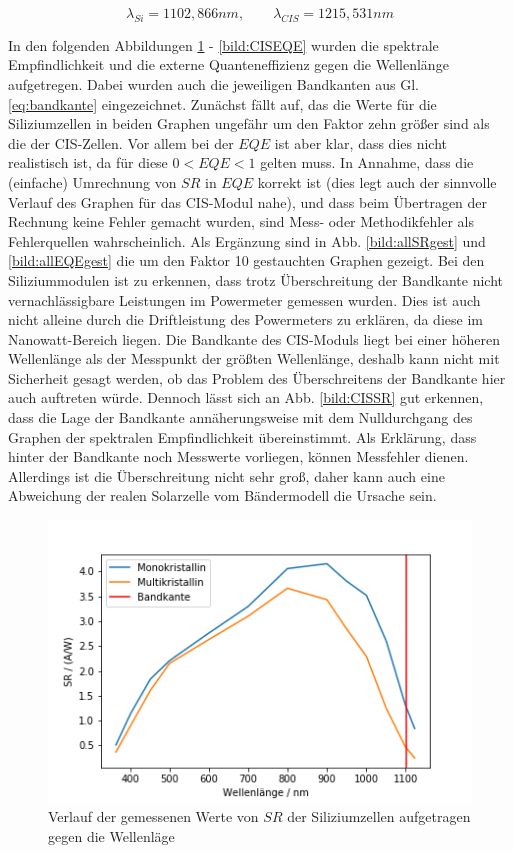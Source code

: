 \begin{equation}
\lambda_{Si} = 1102,866 nm, \qquad \lambda_{CIS} = 1215,531 nm
\label{eq:bandkante}
\end{equation}

In den folgenden Abbildungen \ref{bild:SiSRMess} - \ref{bild:CISEQE} wurden die spektrale Empfindlichkeit und die externe Quanteneffizienz gegen die Wellenlänge aufgetregen.
Dabei wurden auch die jeweiligen Bandkanten aus Gl. \ref{eq:bandkante} eingezeichnet.
Zunächst fällt auf, das die Werte für die Siliziumzellen in beiden Graphen ungefähr um den Faktor zehn größer sind als die der 
CIS-Zellen. Vor allem bei der $EQE$ ist aber klar, dass dies nicht realistisch ist, da für diese $0 < EQE < 1$ gelten muss.
In Annahme, dass die (einfache) Umrechnung von $SR$ in $EQE$ korrekt ist (dies legt auch der sinnvolle Verlauf des Graphen für 
das CIS-Modul nahe), und dass beim Übertragen der Rechnung keine Fehler gemacht wurden, sind Mess- oder Methodikfehler als Fehlerquellen
wahrscheinlich. Als Ergänzung sind in Abb. \ref{bild:allSRgest} und \ref{bild:allEQEgest} die um den Faktor 10 gestauchten Graphen gezeigt.
 Bei den Siliziummodulen ist zu erkennen, dass trotz 
Überschreitung der Bandkante nicht vernachlässigbare Leistungen im Powermeter gemessen wurden. Dies ist auch nicht alleine durch die 
Driftleistung des Powermeters zu erklären, da diese im Nanowatt-Bereich liegen. 
Die Bandkante des CIS-Moduls liegt bei einer höheren Wellenlänge als der Messpunkt der größten Wellenlänge, deshalb kann nicht mit 
Sicherheit gesagt werden, ob das Problem des Überschreitens der Bandkante hier auch auftreten würde. Dennoch lässt sich an Abb. 
\ref{bild:CISSR} gut erkennen, dass die Lage der Bandkante annäherungsweise mit dem Nulldurchgang des Graphen der spektralen Empfindlichkeit
übereinstimmt. Als Erklärung, dass hinter der Bandkante noch Messwerte vorliegen, können Messfehler dienen. Allerdings ist die 
Überschreitung nicht sehr groß, daher kann auch eine Abweichung der realen Solarzelle vom Bändermodell die Ursache sein. \\

\begin{figure}[h]
    \centering
    \includegraphics[scale=0.75]{Bilder/32SiSR.png}
    \caption{Verlauf der gemessenen Werte von $SR$ der Siliziumzellen aufgetragen gegen die Wellenläge}
    \label{bild:SiSRMess}
\end{figure}

